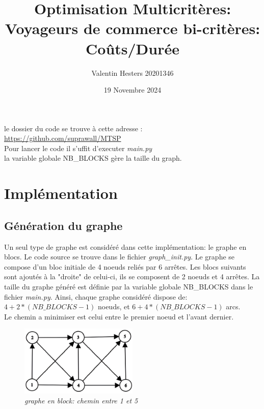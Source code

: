 \documentclass[]{article}
\title{Optimisation Multicritères:\\
        Voyageurs de commerce bi-critères: Coûts/Durée}
\author{Valentin Hesters 20201346}
\date{19 Novembre 2024}
\begin{document}
\maketitle
\renewcommand*{\contentsname}{Sommaire}
\tableofcontents
\vspace{0.75cm}
le dossier du code se trouve à cette adresse :\\
\href{https://github.com/suprawall/MTSP}{https://github.com/suprawall/MTSP}\\

Pour lancer le code il s'uffit d'executer \textit{main.py}\\
la variable globale NB\_BLOCKS
gère la taille du graph.

\section{Implémentation}
    \subsection{Génération du graphe}
        Un seul type de graphe est considéré dans cette implémentation:
        le graphe en blocs. Le code source se trouve dans le fichier
        \textit{graph\_init.py}. Le graphe se compose d'un bloc initiale de 4 noeuds
        reliés par 6 arrêtes. Les blocs suivants sont ajoutés à la 
        "droite" de celui-ci, ils se composent de 2 noeuds et 4 arrêtes.
        La taille du graphe généré est définie par la variable globale
        NB\_BLOCKS dans le fichier \textit{main.py}. Ainsi, chaque graphe
        considéré dispose de:\\
        $4 + 2 * (NB\_BLOCKS - 1)$ noeuds, et $6 + 4 * (NB\_BLOCKS - 1)$ arcs.\\
        Le chemin a minimiser est celui entre le premier noeud
        et l'avant dernier.
        \begin{figure}[H]
            \centering
            \includegraphics[width=0.5\textwidth]{output/pixelcut-export.png}
            \caption{\textit{graphe en block: chemin entre 1 et 5}}
        \end{figure}
\end{document}
